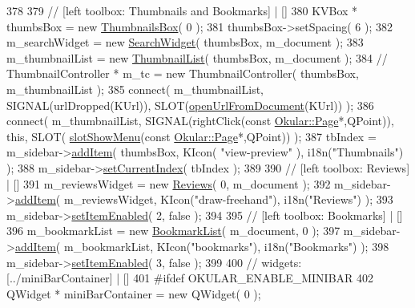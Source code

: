 \begin{DoxyCode}
{378 
379     \textcolor{comment}{// [left toolbox: Thumbnails and Bookmarks] | []}
380     KVBox * thumbsBox = \textcolor{keyword}{new} \hyperlink{classThumbnailsBox}{ThumbnailsBox}( 0 );
381     thumbsBox->setSpacing( 6 );
382     m\_searchWidget = \textcolor{keyword}{new} \hyperlink{classSearchWidget}{SearchWidget}( thumbsBox, m\_document );
383     m\_thumbnailList = \textcolor{keyword}{new} \hyperlink{classThumbnailList}{ThumbnailList}( thumbsBox, m\_document );
384     \textcolor{comment}{//  ThumbnailController * m\_tc = new ThumbnailController( thumbsBox, m\_thumbnailList );}
385     connect( m\_thumbnailList, SIGNAL(urlDropped(KUrl)), SLOT(\hyperlink{classOkular_1_1Part_a95dad8c98085c2a00d68864bb967140d}{openUrlFromDocument}(KUrl)) 
      );
386     connect( m\_thumbnailList, SIGNAL(rightClick(\textcolor{keyword}{const} \hyperlink{classOkular_1_1Page}{Okular::Page}*,QPoint)), \textcolor{keyword}{this}, SLOT(
      \hyperlink{classOkular_1_1Part_a8b10f21181b6b35ba85586081ea4055f}{slotShowMenu}(\textcolor{keyword}{const} \hyperlink{classOkular_1_1Page}{Okular::Page}*,QPoint)) );
387     tbIndex = m\_sidebar->\hyperlink{classSidebar_a642911afe1e9edd9d758df420a12a03d}{addItem}( thumbsBox, KIcon( \textcolor{stringliteral}{"view-preview"} ), i18n(\textcolor{stringliteral}{"Thumbnails"}) );
388     m\_sidebar->\hyperlink{classSidebar_a2e8f04dcf175f5d4dc5b6961a417611e}{setCurrentIndex}( tbIndex );
389 
390     \textcolor{comment}{// [left toolbox: Reviews] | []}
391     m\_reviewsWidget = \textcolor{keyword}{new} \hyperlink{classReviews}{Reviews}( 0, m\_document );
392     m\_sidebar->\hyperlink{classSidebar_a642911afe1e9edd9d758df420a12a03d}{addItem}( m\_reviewsWidget, KIcon(\textcolor{stringliteral}{"draw-freehand"}), i18n(\textcolor{stringliteral}{"Reviews"}) );
393     m\_sidebar->\hyperlink{classSidebar_a4284408c37255e81f294508f4cd19f76}{setItemEnabled}( 2, \textcolor{keyword}{false} );
394 
395     \textcolor{comment}{// [left toolbox: Bookmarks] | []}
396     m\_bookmarkList = \textcolor{keyword}{new} \hyperlink{classBookmarkList}{BookmarkList}( m\_document, 0 );
397     m\_sidebar->\hyperlink{classSidebar_a642911afe1e9edd9d758df420a12a03d}{addItem}( m\_bookmarkList, KIcon(\textcolor{stringliteral}{"bookmarks"}), i18n(\textcolor{stringliteral}{"Bookmarks"}) );
398     m\_sidebar->\hyperlink{classSidebar_a4284408c37255e81f294508f4cd19f76}{setItemEnabled}( 3, \textcolor{keyword}{false} );
399 
400     \textcolor{comment}{// widgets: [../miniBarContainer] | []}
401 \textcolor{preprocessor}{#ifdef OKULAR\_ENABLE\_MINIBAR}
402     QWidget * miniBarContainer = \textcolor{keyword}{new} QWidget( 0 );
}
\end{DoxyCode}
